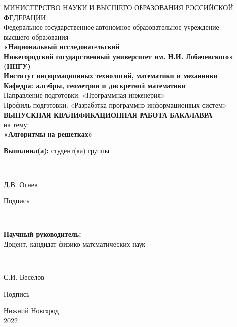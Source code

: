 \begin{titlepage}
\newpage

\begin{center}
	МИНИСТЕРСТВО НАУКИ И ВЫСШЕГО ОБРАЗОВАНИЯ РОССИЙСКОЙ ФЕДЕРАЦИИ \\
	\fontsize{14}{12}\selectfont
	Федеральное государственное автономное образовательное учреждение\\ высшего образования \\
	
	\textbf
	{«Национальный исследовательский \\ Нижегородский государственный
	 университет им. Н.И. Лобачевского» \\ (ННГУ)} \\
	\hfill \break
	\hfill \break
	\hfill \break
	\textbf{Институт информационных технологий, математики и механники} \\
	\hfill \break
	\hfill \break
	\textbf{Кафедра: алгебры, геометрии и дискретной математики} \\
	\hfill \break
	\hfill \break
	Направление подготовки: «Программная инженерия» \\
	\fontsize{13}{12}\selectfont
	Профиль подготовки: «Разработка программно-информационных систем» \\
	\fontsize{14}{12}\selectfont
	\hfill \break
	\hfill \break
	\hfill \break
	\textbf{ВЫПУСКНАЯ КВАЛИФИКАЦИОННАЯ РАБОТА БАКАЛАВРА} \\
	\vspace{1em}
	на тему: \\
	\textbf{«Алгоритмы на решетках»} \\
\end{center}

\vspace{8em}

\fontsize{14}{12}\selectfont
\hfill\parbox{8cm}{
	\textbf{Выполнил(а):} студент(ка) группы \makebox[1cm]{\hrulefill}
} \\
\vspace{1em}
\hfill\parbox{7cm}{
	\underline{\hspace{4cm}} Д.В. Огнев
	\begin{center}
	Подпись
	\end{center}
}\\
\vspace{1em}
\hfill\parbox{8cm}{
	\textbf{Научный руководитель:} \\
	Доцент, кандидат физико-математических наук
} \\
\vspace{1em}
\hfill\parbox{7cm}{
	\underline{\hspace{4cm}} С.И. Весёлов
	\begin{center}
	Подпись
	\end{center}
}



\vspace{\fill}

\begin{center}
Нижний Новгород \\2022
\end{center}

\end{titlepage}
\clearpage